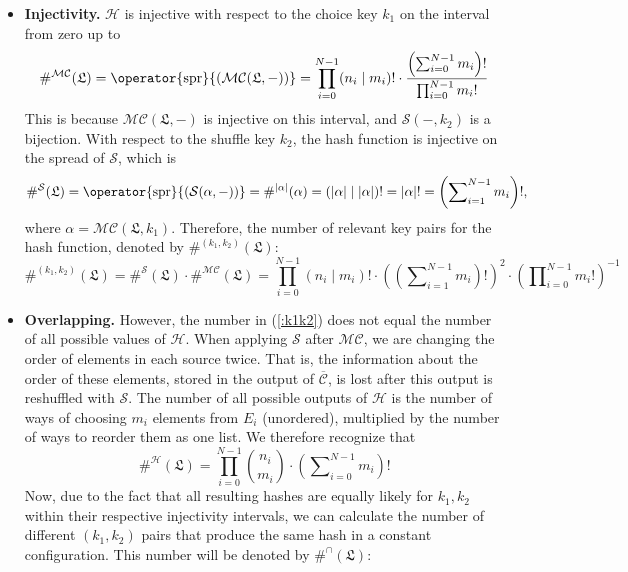 \documentclass[12pt, a4paper]{article}
\renewcommand{\C}{\mathcal{C}}
\newcommand{\CC}{\overline{\mathcal{C}}}
\renewcommand{\H}{\mathcal{H}}
\renewcommand{\S}{\mathcal{S}}
\newcommand{\M}{\mathcal{M}}
\newcommand{\conf}{\mathfrak{L}}
\newcommand{\spr}[1]{\operator{\mathrm{spr}}{\left(#1\right)}}
\begin{document}
\begin{itemize}
    \item \textbf{Injectivity.}
        $ \H $ is injective with respect to the choice key $ k_1 $ on the interval from zero up to
        \begin{equation}
            \#^{\M\C}(\conf) = \spr{\M\C(\conf, -)} = \prod\limits_{i = 0}^{N-1} (n_i \mid m_i)! \cdot \frac{\left( \sum\nolimits_{i = 0}^{N-1} m_i \right)!}{\prod\nolimits_{i = 0}^{N-1} m_i!}
        \end{equation}
        This is because $ \M\C(\conf, -) $ is injective on this interval, and $ \S(-, k_2) $ is a bijection. With respect to the shuffle key $ k_2 $, the hash function is injective on the spread of $ \S $, which is
        \begin{equation}
            \#^{\S}(\conf) = \spr{\S(\alpha, -)} = \#^{|\alpha|}(\alpha) = (|\alpha| \mid |\alpha|)! = |\alpha|! = \left( \sum\nolimits_{i = 1}^{N-1} m_i \right)!,
        \end{equation}
        where $ \alpha = \M\C(\conf, k_1) $. Therefore, the number of relevant key pairs for the hash function, denoted by $ \#^{(k_1, k_2)}(\conf) $:
        \begin{equation}\label{:k1k2}
            \#^{(k_1, k_2)}(\conf) = \#^{\S}(\conf) \cdot \#^{\M\C}(\conf) = \prod\limits_{i = 0}^{N-1} (n_i \mid m_i)! \cdot \left(\left( \sum\nolimits_{i = 1}^{N-1} m_i \right)!\right)^2 \cdot \left( \prod\nolimits_{i = 0}^{N-1} m_i! \right)^{-1}
        \end{equation}
    \item \textbf{Overlapping.}
        However, the number in (\ref{:k1k2}) does not equal the number of all possible values of $ \H $. When applying $ \S $ after $ \M\C $, we are changing the order of elements in each source twice. That is, the information about the order of these elements, stored in the output of $ \CC $, is lost after this output is reshuffled with $ \S $. The number of all possible outputs of $ \H $ is the number of ways of choosing $ m_i $ elements from $ E_i $ (unordered), multiplied by the number of ways to reorder them as one list. We therefore recognize that
        \begin{equation}\label{:H}
            \#^{\H}(\conf) = \prod\limits_{i = 0}^{N-1} {{n_i}\choose{m_i}} \cdot \left(\sum\nolimits_{i = 0}^{N-1} m_i\right)!
        \end{equation}
        Now, due to the fact that all resulting hashes are equally likely for $ k_1, k_2 $ within their respective injectivity intervals, we can calculate the number of different $ (k_1, k_2) $ pairs that produce the same hash in a constant configuration. This number will be denoted by $ \#^{\cap}(\conf) $:

\end{itemize}
\end{document}
